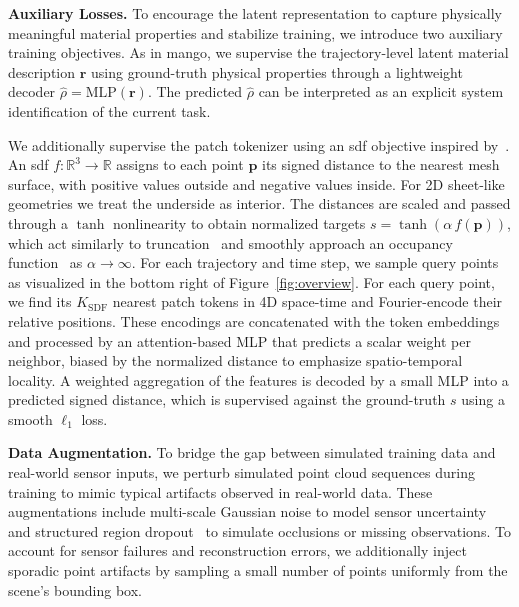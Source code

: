 \textbf{Auxiliary Losses.}
To encourage the latent representation to capture physically meaningful material properties and stabilize training, we introduce two auxiliary training objectives.
As in \gls{mango}, we supervise the trajectory-level latent material description $\mathbf{r}$ using ground-truth physical properties through a lightweight decoder $\hat{\rho} = \mathrm{MLP}(\mathbf{r})$.
The predicted $\hat{\rho}$ can be interpreted as an explicit system identification of the current task.

We additionally supervise the patch tokenizer using an \gls{sdf} objective inspired by~\citet{vosylius2024instantpolicyincontextimitation}. 
An \gls{sdf} \mbox{$f: \mathbb{R}^3 \to \mathbb{R}$} assigns to each point $\mathbf p$ its signed distance to the nearest mesh surface, with positive values outside and negative values inside. For 2D sheet-like geometries we treat the underside as interior. 
The distances are scaled and passed through a $\tanh$ nonlinearity to obtain normalized targets $s = \tanh(\alpha\, f(\mathbf p))$, which act similarly to truncation~\citep{curless1996volumetric} and smoothly approach an occupancy function~\citep{mescheder2019occupancy} as $\alpha{\rightarrow}\infty$. 
For each trajectory and time step, we sample query points %
as visualized in the bottom right of Figure~\ref{fig:overview}. 
For each query point, we find its $K_{\text{SDF}}$ nearest patch tokens in 4D space-time and Fourier-encode their relative positions. 
These encodings are concatenated with the token embeddings and processed by an attention-based MLP that predicts a scalar weight per neighbor, biased by the normalized distance to emphasize spatio-temporal locality. 
A weighted aggregation of the features is decoded by a small MLP into a predicted signed distance, which is supervised against the ground-truth $s$ using a smooth $\ell_1$ loss.

\textbf{Data Augmentation.}
To bridge the gap between simulated training data and real-world sensor inputs, we perturb simulated point cloud sequences during training to mimic typical artifacts observed in real-world data.
These augmentations include multi-scale Gaussian noise to model sensor uncertainty and structured region dropout~\citep{cutout} to simulate occlusions or missing observations. 
To account for sensor failures and reconstruction errors, we additionally inject sporadic point artifacts by sampling a small number of points uniformly from the scene's bounding box.

